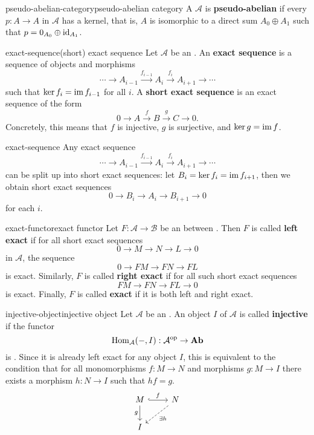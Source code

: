 \begin{topic}{pseudo-abelian-category}{pseudo-abelian category}
    A  $\mathcal{A}$ is \textbf{pseudo-abelian} if every  $p : A \to A$ in $\mathcal{A}$ has a kernel, that is, $A$ is isomorphic to a direct sum $A_0 \oplus A_1$ such that $p = 0_{A_0} \oplus \textup{id}_{A_1}$.
\end{topic}

\begin{topic}{exact-sequence}{(short) exact sequence}
    Let $\mathcal{A}$ be an . An \textbf{exact sequence} is a sequence of objects and morphisms
    \[ \cdots \rightarrow A_{i - 1} \xrightarrow{f_{i - 1}} A_i \xrightarrow{f_i} A_{i + 1} \rightarrow \cdots \]
    such that $\ker f_i = \operatorname{im} f_{i - 1}$ for all $i$.
    A \textbf{short exact sequence} is an exact sequence of the form
    \[ 0 \to A \xrightarrow{f} B \xrightarrow{g} C \to 0 . \]
    Concretely, this means that $f$ is injective, $g$ is surjective, and $\ker g = \operatorname{im} f$.
\end{topic}

\begin{example}{exact-sequence}
    Any exact sequence
    \[ \cdots \rightarrow A_{i - 1} \xrightarrow{f_{i - 1}} A_i \xrightarrow{f_i} A_{i + 1} \rightarrow \cdots \]
    can be split up into short exact sequences: let $B_i = \ker f_i = \operatorname{im} f_{i + 1}$, then we obtain short exact sequences
    \[ 0 \to B_i \to A_i \to B_{i + 1} \to 0 \]
    for each $i$.
\end{example}

\begin{topic}{exact-functor}{exact functor}
    Let $F : \mathcal{A} \to \mathcal{B}$ be an  between . Then $F$ is called \textbf{left exact} if for all short exact sequences
    \[ 0 \to M \to N \to L \to 0 \]
     in $\mathcal{A}$, the sequence
    \[ 0 \to FM \to FN \to FL \]
    is exact. Similarly, $F$ is called \textbf{right exact} if for all such short exact sequences
    \[ FM \to FN \to FL \to 0 \]
    is exact. Finally, $F$ is called \textbf{exact} if it is both left and right exact.
\end{topic}

\begin{topic}{injective-object}{injective object}
    Let $\mathcal{A}$ be an . An object $I$ of $\mathcal{A}$ is called \textbf{injective} if the functor
    \[ \operatorname{Hom}_\mathcal{A}(-, I) : \mathcal{A}^\textup{op} \to \textbf{Ab} \]
    is . Since it is already left exact for any object $I$, this is equivalent to the condition that for all monomorphisms $f : M \to N$ and morphisms $g : M \to I$ there exists a morphism $h : N \to I$ such that $hf = g$.
    \[ \begin{tikzcd} M \arrow[hookrightarrow]{r}{f} \arrow[swap]{d}{g} & N \arrow[dashed]{ld}{\exists h} \\ I & \end{tikzcd} \]
\end{topic}

